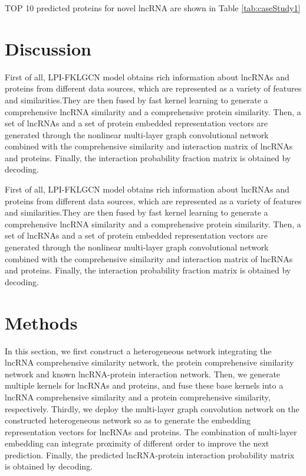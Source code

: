 \documentclass[fleqn,10pt]{wlscirep}
\begin{document}
TOP 10 predicted proteins for novel lncRNA are shown in Table \ref{tab:caseStudy1}

\section*{Discussion}
First of all, LPI-FKLGCN model obtains rich information about lncRNAs and proteins from different data sources, which are represented as a variety of features and similarities.They are then fused by fast kernel learning to generate a comprehensive lncRNA similarity and a comprehensive protein similarity. Then, a set of lncRNAs and a set of protein embedded representation vectors are generated through the nonlinear multi-layer graph convolutional network combined with the comprehensive similarity and interaction matrix of lncRNAs and proteins. Finally, the interaction probability fraction matrix is obtained by decoding.

First of all, LPI-FKLGCN model obtains rich information about lncRNAs and proteins from different data sources, which are represented as a variety of features and similarities.They are then fused by fast kernel learning to generate a comprehensive lncRNA similarity and a comprehensive protein similarity. Then, a set of lncRNAs and a set of protein embedded representation vectors are generated through the nonlinear multi-layer graph convolutional network combined with the comprehensive similarity and interaction matrix of lncRNAs and proteins. Finally, the interaction probability fraction matrix is obtained by decoding.

\section*{Methods}
In this section, we first construct a heterogeneous network integrating the lncRNA comprehensive similarity network, the protein comprehensive similarity network and known lncRNA-protein interaction network. Then, we generate multiple kernels for lncRNAs and proteins, and fuse these base kernels into a lncRNA comprehensive similarity and a protein comprehensive similarity, respectively. Thirdly, we deploy the multi-layer graph convolution network on the constructed heterogeneous network so as to generate the embedding representation vectors for lncRNAs and proteins. The combination of multi-layer embedding can integrate proximity of different order to improve the next prediction. Finally, the predicted lncRNA-protein interaction probability matrix is obtained by decoding. 
\end{document}
